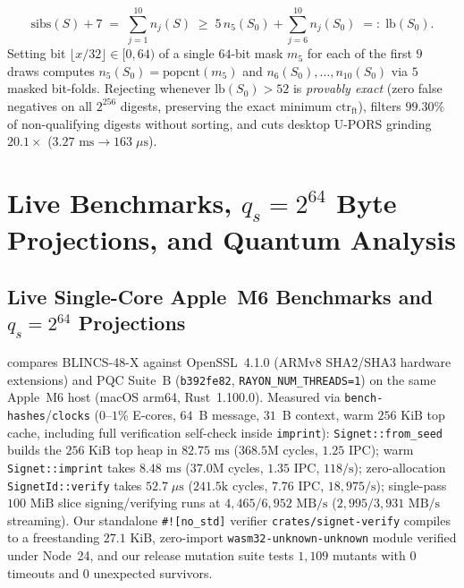 \documentclass[11pt,a4paper]{article}
\theoremstyle{definition}
\theoremstyle{remark}
\newcommand{\BLINCS}{\textsf{BLINCS-48-X}}
\newcommand{\UPORS}{\textsf{U-PORS}}
\begin{document}
\begin{enumerate}[leftmargin=1.4em,itemsep=2pt]
    \[
      \mathrm{sibs}(S) + 7 \;=\; \sum_{j=1}^{10} n_j(S) \;\ge\; 5\, n_5(S_0) + \sum_{j=6}^{10} n_j(S_0) \;=:\; \mathrm{lb}(S_0).
    \]
    Setting bit $\lfloor x / 32 \rfloor \in [0, 64)$ of a single $64$-bit mask $m_5$ for each of the first $9$ draws computes $n_5(S_0) = \mathrm{popcnt}(m_5)$ and $n_6(S_0),\dots,n_{10}(S_0)$ via $5$ masked bit-folds. Rejecting whenever $\mathrm{lb}(S_0) > 52$ is \emph{provably exact} (zero false negatives on all $2^{256}$ digests, preserving the exact minimum $\mathrm{ctr}_{\mathrm{ft}}$), filters $99.30\%$ of non-qualifying digests without sorting, and cuts desktop \UPORS{} grinding $20.1\times$ ($3.27\text{ ms} \to 163\;\mu\text{s}$).
\end{enumerate}

\section{Live Benchmarks, $q_s = 2^{64}$ Byte Projections, and Quantum Analysis}
\label{sec:comparison}

\subsection{Live Single-Core Apple~M6 Benchmarks and $q_s = 2^{64}$ Projections}
 compares \BLINCS{} against OpenSSL~4.1.0 (ARMv8 SHA2/SHA3 hardware extensions) and PQC Suite~B (\texttt{b392fe82}, \texttt{RAYON\_NUM\_THREADS=1}) on the same Apple~M6 host (macOS arm64, Rust~1.100.0). Measured via \texttt{bench-hashes}/\texttt{clocks} ($0$--$1\%$ E-cores, $64$~B message, $31$~B context, warm $256\text{ KiB}$ top cache, including full verification self-check inside \texttt{imprint}):
\texttt{Signet::from\_seed} builds the $256\text{ KiB}$ top heap in \textbf{$82.75\text{ ms}$} ($368.5\text{M}$ cycles, $1.25$ IPC);
warm \texttt{Signet::imprint} takes \textbf{$8.48\text{ ms}$} ($37.0\text{M}$ cycles, $1.35$ IPC, $118/\text{s}$);
zero-allocation \texttt{SignetId::verify} takes \textbf{$52.7\;\mu\text{s}$} ($241.5\text{k}$ cycles, $7.76$ IPC, $18{,}975/\text{s}$);
single-pass $100\text{ MiB}$ slice signing/verifying runs at $4{,}465 / 6{,}952\text{ MB/s}$ ($2{,}995 / 3{,}931\text{ MB/s}$ streaming).
Our standalone \texttt{\#![no\_std]} verifier \texttt{crates/signet-verify} compiles to a freestanding \textbf{$27.1\text{ KiB}$}, zero-import \texttt{wasm32-unknown-unknown} module verified under Node~24, and our release mutation suite tests $1{,}109$ mutants with $0$ timeouts and $0$ unexpected survivors.
\end{document}
